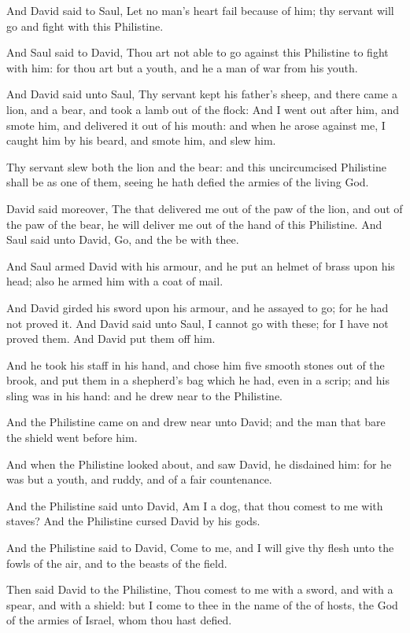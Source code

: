 \Verse And David said to Saul, Let no man's heart fail because of him; thy servant will go and fight with this Philistine.

\Verse And Saul said to David, Thou art not able to go against this Philistine to fight with him: for thou art but a youth, and he a man of war from his youth.

\Verse And David said unto Saul, Thy servant kept his father's sheep, and there came a lion, and a bear, and took a lamb out of the flock: \Verse And I went out after him, and smote him, and delivered it out of his mouth: and when he arose against me, I caught him by his beard, and smote him, and slew him.

\Verse Thy servant slew both the lion and the bear: and this uncircumcised Philistine shall be as one of them, seeing he hath defied the armies of the living God.

\Verse David said moreover, The \LORD that delivered me out of the paw of the lion, and out of the paw of the bear, he will deliver me out of the hand of this Philistine. And Saul said unto David, Go, and the \LORD be with thee.

\Verse And Saul armed David with his armour, and he put an helmet of brass upon his head; also he armed him with a coat of mail.

\Verse And David girded his sword upon his armour, and he assayed to go; for he had not proved it. And David said unto Saul, I cannot go with these; for I have not proved them. And David put them off him.

\Verse And he took his staff in his hand, and chose him five smooth stones out of the brook, and put them in a shepherd's bag which he had, even in a scrip; and his sling was in his hand: and he drew near to the Philistine.

\Verse And the Philistine came on and drew near unto David; and the man that bare the shield went before him.

\Verse And when the Philistine looked about, and saw David, he disdained him: for he was but a youth, and ruddy, and of a fair countenance.

\Verse And the Philistine said unto David, Am I a dog, that thou comest to me with staves? And the Philistine cursed David by his gods.

\Verse And the Philistine said to David, Come to me, and I will give thy flesh unto the fowls of the air, and to the beasts of the field.

\Verse Then said David to the Philistine, Thou comest to me with a sword, and with a spear, and with a shield: but I come to thee in the name of the \LORD of hosts, the God of the armies of Israel, whom thou hast defied.

